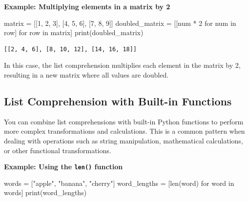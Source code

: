 \documentclass[
  letterpaper,
  DIV=11,
  numbers=noendperiod]{scrreprt}
\newenvironment{Shaded}{\begin{snugshade}}{\end{snugshade}}
\newcommand{\BuiltInTok}[1]{\textcolor[rgb]{0.00,0.23,0.31}{#1}}
\newcommand{\ControlFlowTok}[1]{\textcolor[rgb]{0.00,0.23,0.31}{#1}}
\newcommand{\DecValTok}[1]{\textcolor[rgb]{0.68,0.00,0.00}{#1}}
\newcommand{\KeywordTok}[1]{\textcolor[rgb]{0.00,0.23,0.31}{#1}}
\newcommand{\NormalTok}[1]{\textcolor[rgb]{0.00,0.23,0.31}{#1}}
\newcommand{\OperatorTok}[1]{\textcolor[rgb]{0.37,0.37,0.37}{#1}}
\newcommand{\StringTok}[1]{\textcolor[rgb]{0.13,0.47,0.30}{#1}}
\begin{document}
\textbf{Example: Multiplying elements in a matrix by 2}

\begin{Shaded}
\begin{Highlighting}[]
\NormalTok{matrix }\OperatorTok{=}\NormalTok{ [[}\DecValTok{1}\NormalTok{, }\DecValTok{2}\NormalTok{, }\DecValTok{3}\NormalTok{], [}\DecValTok{4}\NormalTok{, }\DecValTok{5}\NormalTok{, }\DecValTok{6}\NormalTok{], [}\DecValTok{7}\NormalTok{, }\DecValTok{8}\NormalTok{, }\DecValTok{9}\NormalTok{]]}
\NormalTok{doubled\_matrix }\OperatorTok{=}\NormalTok{ [[num }\OperatorTok{*} \DecValTok{2} \ControlFlowTok{for}\NormalTok{ num }\KeywordTok{in}\NormalTok{ row] }\ControlFlowTok{for}\NormalTok{ row }\KeywordTok{in}\NormalTok{ matrix]}
\BuiltInTok{print}\NormalTok{(doubled\_matrix)}
\end{Highlighting}
\end{Shaded}

\begin{verbatim}
[[2, 4, 6], [8, 10, 12], [14, 16, 18]]
\end{verbatim}

In this case, the list comprehension multiplies each element in the
matrix by 2, resulting in a new matrix where all values are doubled.

\hypertarget{list-comprehension-with-built-in-functions}{%
\subsection{List Comprehension with Built-in
Functions}\label{list-comprehension-with-built-in-functions}}

You can combine list comprehensions with built-in Python functions to
perform more complex transformations and calculations. This is a common
pattern when dealing with operations such as string manipulation,
mathematical calculations, or other functional transformations.

\textbf{Example: Using the \texttt{len()} function}

\begin{Shaded}
\begin{Highlighting}[]
\NormalTok{words }\OperatorTok{=}\NormalTok{ [}\StringTok{"apple"}\NormalTok{, }\StringTok{"banana"}\NormalTok{, }\StringTok{"cherry"}\NormalTok{]}
\NormalTok{word\_lengths }\OperatorTok{=}\NormalTok{ [}\BuiltInTok{len}\NormalTok{(word) }\ControlFlowTok{for}\NormalTok{ word }\KeywordTok{in}\NormalTok{ words]}
\BuiltInTok{print}\NormalTok{(word\_lengths)  }
\end{Highlighting}
\end{Shaded}
\end{document}
